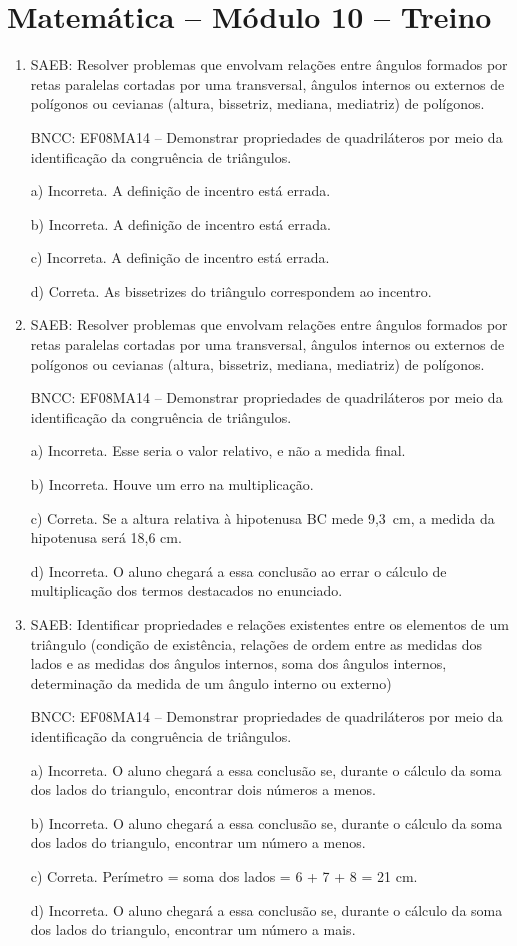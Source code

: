 \section*{Matemática – Módulo 10 – Treino}
\begin{enumerate}
\item SAEB: Resolver problemas que envolvam relações entre ângulos formados
por retas paralelas cortadas por uma transversal, ângulos internos ou
externos de polígonos ou cevianas (altura, bissetriz, mediana,
mediatriz) de polígonos.

BNCC: EF08MA14 -- Demonstrar propriedades de quadriláteros por meio da
identificação da congruência de triângulos.

a) Incorreta. A definição de incentro está errada.

b) Incorreta. A definição de incentro está errada.

c) Incorreta. A definição de incentro está errada.

d) Correta. As bissetrizes do triângulo correspondem ao incentro.
\item SAEB: Resolver problemas que envolvam relações entre ângulos formados
por retas paralelas cortadas por uma transversal, ângulos internos ou
externos de polígonos ou cevianas (altura, bissetriz, mediana,
mediatriz) de polígonos.

BNCC: EF08MA14 -- Demonstrar propriedades de quadriláteros por meio da
identificação da congruência de triângulos.

a) Incorreta. Esse seria o valor relativo, e não a medida final.

b) Incorreta. Houve um erro na multiplicação.

c) Correta. Se a altura relativa à hipotenusa BC mede 9,3~cm, a
medida da hipotenusa será 18,6 cm.

d) Incorreta. O aluno chegará a essa conclusão ao errar o cálculo
de multiplicação dos termos destacados no enunciado.
\item SAEB: Identificar propriedades e relações existentes entre os elementos
de um triângulo (condição de existência, relações de ordem entre as
medidas dos lados e as medidas dos ângulos internos, soma dos ângulos
internos, determinação da medida de um ângulo interno ou externo)

BNCC: EF08MA14 -- Demonstrar propriedades de quadriláteros por meio da
identificação da congruência de triângulos.

a) Incorreta. O aluno chegará a essa conclusão se, durante o
cálculo da soma dos lados do triangulo, encontrar dois números a menos.

b) Incorreta. O aluno chegará a essa conclusão se, durante o
cálculo da soma dos lados do triangulo, encontrar um número a menos.

c) Correta. Perímetro = soma dos lados = 6 + 7 + 8 = 21 cm.

d) Incorreta. O aluno chegará a essa conclusão se, durante o
cálculo da soma dos lados do triangulo, encontrar um número a mais.
\end{enumerate}


